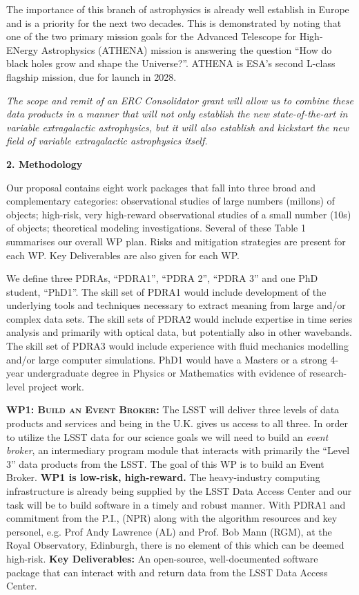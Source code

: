 \documentclass[oneside, a4paper, onecolumn, 11pt]{article}
\begin{document}
\smallskip
\smallskip
\noindent
The importance of this branch of astrophysics is already well
establish in Europe and is a priority for the next two decades. This
is demonstrated by noting that one of the two primary mission goals
for the Advanced Telescope for High-ENergy Astrophysics (ATHENA) mission 
is answering the question ``How do black holes grow and shape the
Universe?''.  ATHENA is ESA's second L-class flagship mission, due for
launch in 2028.

\smallskip
\smallskip
\noindent
{\it The scope and remit of an ERC Consolidator grant will allow us to
combine these data products in a manner that will not only establish
the new state-of-the-art in variable extragalactic astrophysics, but it 
will also establish and kickstart the new field of variable extragalactic
astrophysics itself.}




\medskip
\medskip
\noindent
\large
{\bf{\textcolor{Cerulean}{2. Methodology}}}
\normalsize

\noindent
Our proposal contains eight work packages that fall into three broad
and complementary categories: observational studies of large numbers
(millons) of objects; high-risk, very high-reward observational
studies of a small number (10s) of objects; theoretical modeling
investigations. Several of these Table 1 summarises our overall WP
plan.  Risks and mitigation strategies are present for each WP.  Key
Deliverables are also given for each WP.

\smallskip
\smallskip
\noindent
We define three PDRAs, ``PDRA1'', ``PDRA 2'', ``PDRA 3'' and one PhD
student, ``PhD1''.  The skill set of PDRA1 would include development
of the underlying tools and techniques necessary to extract meaning
from large and/or complex data sets.  The skill sets of PDRA2 would
include expertise in time series analysis and primarily with optical
data, but potentially also in other wavebands.  The skill set of PDRA3
would include experience with fluid mechanics modelling and/or large
computer simulations.  PhD1 would have a Masters or a strong 4-year
undergraduate degree in Physics or Mathematics with evidence of
research-level project work.


\smallskip
\smallskip
\noindent
\textbf{\textsc{WP1: Build an Event Broker:}} 
The LSST will deliver three levels of data products and services and
being in the U.K. gives us access to all three.  In order to utilize
the LSST data for our science goals we will need to build an {\it
event broker}, an intermediary program module that interacts with
primarily the ``Level 3'' data products from the LSST.
The goal of this WP is to build an Event Broker.  {\bf WP1 is
low-risk, high-reward.}  The heavy-industry computing infrastructure
is already being supplied by the LSST Data Access Center and our task
will be to build software in a timely and robust manner. With PDRA1
and commitment from the P.I., (NPR) along with the algorithm resources
and key personel, e.g. Prof Andy Lawrence (AL) and Prof. Bob Mann
(RGM), at the Royal Observatory, Edinburgh, there is no element of
this which can be deemed high-risk.  {\bf Key Deliverables:} An
open-source, well-documented software package that can interact with
and return data from the LSST Data Access Center.
\end{document}
